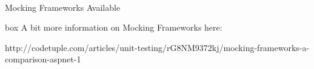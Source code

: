 \paragraph {}
Mocking Frameworks Available

{box}
A bit more information on Mocking Frameworks here:

http://codetuple.com/articles/unit-testing/rG8NM9372kj/mocking-frameworks-a-comparison-aspnet-1 
